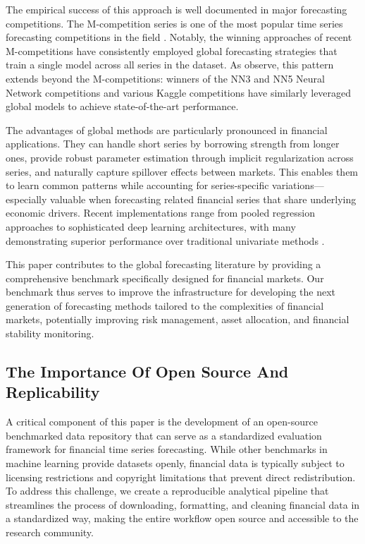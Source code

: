 \documentclass{article}
\begin{document}
The empirical success of this approach is well documented in major forecasting competitions. The M-competition series is one of the most popular time series forecasting competitions in the field \citep{Makridakis1982, Makridakis2000, Makridakis2018, Makridakis2022}. Notably, the winning approaches of recent M-competitions have consistently employed global forecasting strategies that train a single model across all series in the dataset. As \citet{Godahewa2021} observe, this pattern extends beyond the M-competitions: winners of the NN3 and NN5 Neural Network competitions and various Kaggle competitions have similarly leveraged global models to achieve state-of-the-art performance.

The advantages of global methods are particularly pronounced in financial applications. They can handle short series by borrowing strength from longer ones, provide robust parameter estimation through implicit regularization across series, and naturally capture spillover effects between markets. This enables them to learn common patterns while accounting for series-specific variations—especially valuable when forecasting related financial series that share underlying economic drivers. Recent implementations range from pooled regression approaches to sophisticated deep learning architectures, with many demonstrating superior performance over traditional univariate methods \citep{Godahewa2021}.

This paper contributes to the global forecasting literature by providing a comprehensive benchmark specifically designed for financial markets.
Our benchmark thus serves to improve the infrastructure for developing the next generation of forecasting methods tailored to the complexities of financial markets, potentially improving risk management, asset allocation, and financial stability monitoring.



\subsection{The Importance Of Open Source And Replicability}

A critical component of this paper is the development of an open-source benchmarked data repository that can serve as a standardized evaluation framework for financial time series forecasting. While other benchmarks in machine learning provide datasets openly, financial data is typically subject to licensing restrictions and copyright limitations that prevent direct redistribution. To address this challenge, we create a reproducible analytical pipeline that streamlines the process of downloading, formatting, and cleaning financial data in a standardized way, making the entire workflow open source and accessible to the research community.
\end{document}
